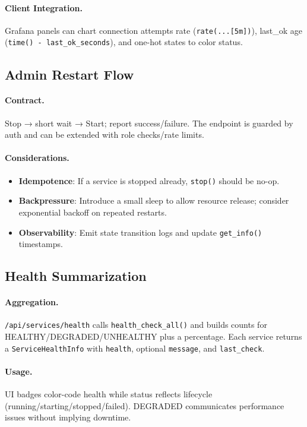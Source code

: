 \documentclass[11pt]{article}
\begin{document}
\paragraph{Client Integration.} Grafana panels can chart connection attempts rate (\texttt{rate(...[5m])}), last\_ok age (\texttt{time() - last\_ok\_seconds}), and one-hot states to color status.


\subsection{Admin Restart Flow}

\paragraph{Contract.} Stop → short wait → Start; report success/failure. The endpoint is guarded by auth and can be extended with role checks/rate limits.

\paragraph{Considerations.}
\begin{itemize}[nosep]
  \item \textbf{Idempotence}: If a service is stopped already, \texttt{stop()} should be no-op.
  \item \textbf{Backpressure}: Introduce a small sleep to allow resource release; consider exponential backoff on repeated restarts.
  \item \textbf{Observability}: Emit state transition logs and update \texttt{get\_info()} timestamps.
\end{itemize}

\subsection{Health Summarization}

\paragraph{Aggregation.} \texttt{/api/services/health} calls \texttt{health\_check\_all()} and builds counts for HEALTHY/DEGRADED/UNHEALTHY plus a percentage. Each service returns a \texttt{ServiceHealthInfo} with \texttt{health}, optional \texttt{message}, and \texttt{last\_check}.

\paragraph{Usage.} UI badges color-code health while status reflects lifecycle (running/starting/stopped/failed). DEGRADED communicates performance issues without implying downtime.
\end{document}
